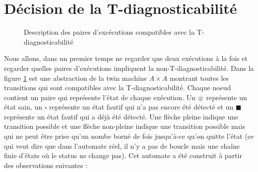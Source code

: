 \documentclass[conference]{IEEEtran}
\newcommand{\es}{\square}
\newcommand{\fs}{\blacksquare}
\newcommand{\ec}{\ocircle}
\begin{document}
\section{Décision de la T-diagnosticabilité}
\begin{figure}
\caption{Description des paires d'excécutions compatibles avec la T-diagnosticabilité}
\label{a2diag}
\end{figure}
Nous allons, dans un premier temps ne regarder que deux exécutions à la fois et regarder quelles paires d'exécutions impliquent la non-T-diagnosticabilité. Dans la figure \ref{a2diag} est une abstraction de la twin machine $A\times A$ montrant toutes les transitions qui sont compatibles avec la T-diagnosticabilité. Chaque noeud contient un paire qui représente l'état de chaque exécution. Un $\ec$ représente un état sain, un $\es$ représente un état fautif qui n'a pas encore été détecté et un $\fs$ représente un état fautif qui a déjà été détecté. Une flèche pleine indique une transition possible et une flèche non-pleine indique une transition possible mais qui ne peut être prise qu'un nombe borné de fois jusqu'à-ce qu'on quitte l'état (ce qui veut dire que dans l'automate réel, il n'y a pas de boucle mais une chaîne finie d'états où le status ne change pas). Cet automate a été construit \`a partir des observations suivantes :
\end{document}
